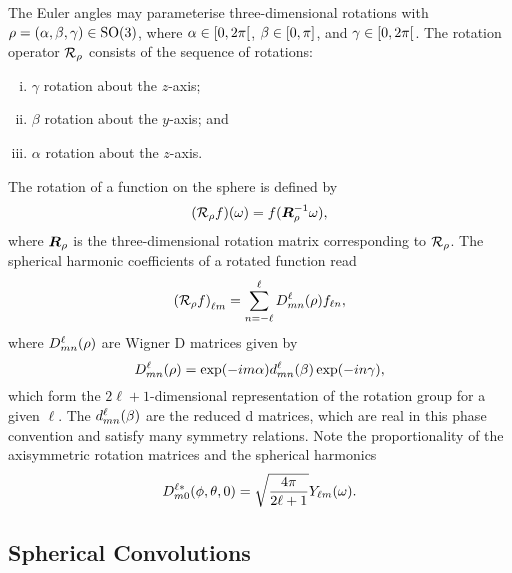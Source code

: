 The Euler angles may parameterise three-dimensional rotations with \(\rho = (\alpha,\beta,\gamma) \in \rotationGroup{}\), where \(\alpha \in \interval[open right]{0}{2\pi}\), \(\beta \in \interval{0}{\pi}\), and \(\gamma \in \interval[open right]{0}{2\pi}\).
The rotation operator \(\rotation{\rho}\) consists of the sequence of rotations:
%
\begin{enumerate}[(i),nosep,left=\parindent]
	\item \({\gamma}\) rotation about the \(z\)-axis;
	\item \({\beta}\) rotation about the \(y\)-axis; and
	\item \({\alpha}\) rotation about the \(z\)-axis.
\end{enumerate}
%
The rotation of a function on the sphere is defined by
%
\begin{equation}\label{eq:chapter3_rotation_matrix}
	\pixel{(\rotation{\rho}f)}
	= f(\rotationMatrix^{-1} \omega),
\end{equation}
%
where \(\rotationMatrix{}\) is the three-dimensional rotation matrix corresponding to \(\rotation{\rho}\).
The spherical harmonic coefficients of a rotated function read
%
\begin{equation}\label{eq:chapter3_rotation_operator}
	\harmonic{(\rotation{\rho}f)}
	= \wignerSum \wigner{\ell}{m}{n}(\rho) f_{\ell n},
\end{equation}
%
where \(\wigner{\ell}{m}{n}(\rho)\) are Wigner D matrices given by
%
\begin{equation}
	\wigner{\ell}{m}{n}(\rho)
	= \exp(-i m\alpha) \reducedWigner{\ell}{m}{n}(\beta) \exp(-i n\gamma),
\end{equation}
%
which form the \(2\ell+1\)-dimensional representation of the rotation group for a given \(\ell{}\).
The \(\reducedWigner{\ell}{m}{n}(\beta)\) are the reduced d matrices, which are real in this phase convention and satisfy many symmetry relations.
Note the proportionality of the axisymmetric rotation matrices and the spherical harmonics
%
\begin{equation}\label{eq:chapter3_wigner_axisymmetric}
	\wigner[\ast]{\ell}{m}{0}(\phi,\theta,0)
	= \sqrt{\inverseFactor} \pixel{\harmonic{Y}}.
\end{equation}

\subsection{Spherical Convolutions}\label{sec:chapter3_spherical_convolutions}

